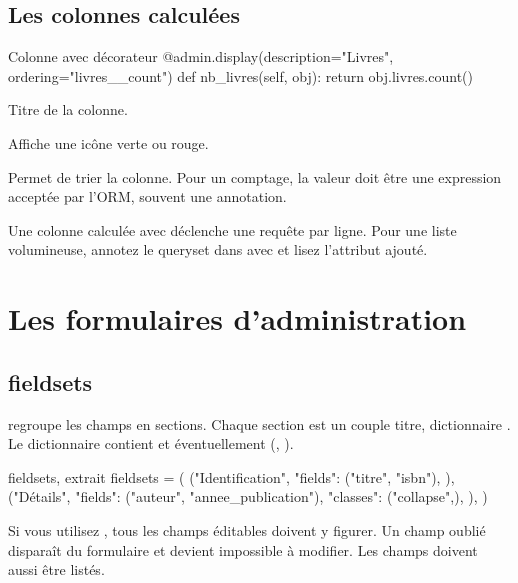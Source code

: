 \subsection{Les colonnes calculées}

\begin{codebox}[python]{Colonne avec décorateur}
@admin.display(description="Livres", ordering="livres__count")
def nb_livres(self, obj):
    return obj.livres.count()
\end{codebox}

\begin{description}[leftmargin=4.4cm,style=nextline]
  \item[\code{description}] Titre de la colonne.
  \item[\code{boolean}] Affiche une icône verte ou rouge.
  \item[\code{ordering}] Permet de trier la colonne. Pour un comptage, la valeur
  doit être une expression acceptée par l'ORM, souvent une annotation.
\end{description}

\begin{note}
Une colonne calculée avec  déclenche une requête par
ligne. Pour une liste volumineuse, annotez le queryset dans
 avec  et lisez l'attribut ajouté.
\end{note}

\section{Les formulaires d'administration}

\subsection{fieldsets}

 regroupe les champs en sections. Chaque section est un couple
\og titre, dictionnaire \fg. Le dictionnaire contient  et
éventuellement  (, ).

\begin{codebox}[python]{fieldsets, extrait}
fieldsets = (
    ("Identification", {
        "fields": ("titre", "isbn"),
    }),
    ("Détails", {
        "fields": ("auteur", "annee_publication"),
        "classes": ("collapse",),
    }),
)
\end{codebox}

\begin{attention}
Si vous utilisez , tous les champs éditables doivent y figurer.
Un champ oublié disparaît du formulaire et devient impossible à modifier. Les
champs  doivent aussi être listés.
\end{attention}

